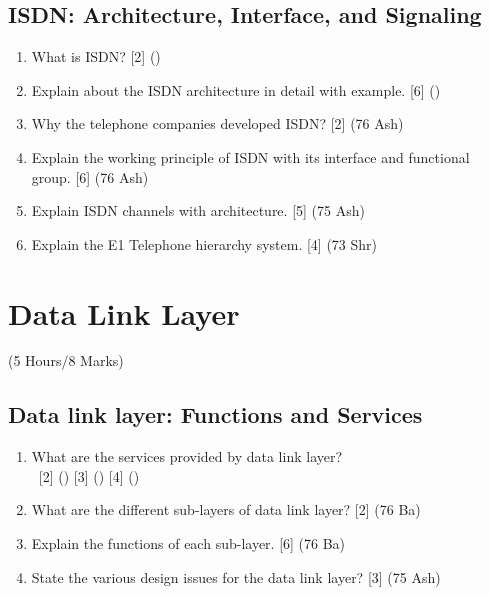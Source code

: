 \documentclass[12pt]{article}
\newcommand{\enter}{\\\textcolor{white}{1}}
\begin{document}
	\subsection{ISDN: Architecture, Interface, and Signaling}
		\begin{enumerate}[noitemsep, topsep=0pt]
			\item What is ISDN? \hfill [2] ()
			
			\item Explain about the ISDN architecture in detail with example. \hfill [6] ()
			
			\item Why the telephone companies developed ISDN? \hfill [2] (76 Ash)
			
			\item Explain the working principle of ISDN with its interface and functional group. \hfill [6] (76 Ash)
			
			\item Explain ISDN channels with architecture. \hfill [5] (75 Ash)
			
			\item Explain the E1 Telephone hierarchy system. \hfill [4] (73 Shr)
		\end{enumerate}

	\pagebreak

\section{Data Link Layer}
	\begin{center}(5 Hours/8 Marks)\end{center}
	\subsection{Data link layer: Functions and Services}
		\begin{enumerate}[noitemsep, topsep=0pt]
			\item What are the services provided by data link layer?
			\enter\hfill [2] () [3] () [4] () 

			\item What are the different sub-layers of data link layer? \hfill [2] (76 Ba)

			\item Explain the functions of each sub-layer. \hfill [6] (76 Ba)

			\item State the various design issues for the data link layer? \hfill [3] (75 Ash)
		\end{enumerate}
		
\end{document}
